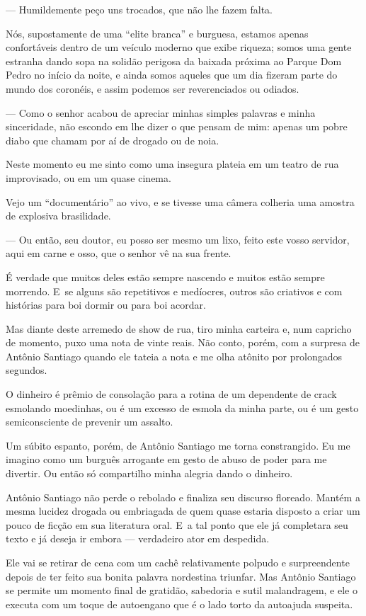 — Humildemente peço uns trocados, que não lhe fazem falta.

Nós, supostamente de uma ``elite branca'' e burguesa, estamos apenas
confortáveis dentro de um veículo moderno que exibe riqueza; somos uma
gente estranha dando sopa na solidão perigosa da baixada próxima ao
Parque Dom Pedro no início da noite, e ainda somos aqueles que um dia
fizeram parte do mundo dos coronéis, e assim podemos ser reverenciados
ou odiados.

— Como o senhor acabou de apreciar minhas simples palavras e minha
sinceridade, não escondo em lhe dizer o que pensam de mim: apenas um
pobre diabo que chamam por aí de drogado ou de noia.

Neste momento eu me sinto como uma insegura plateia em um teatro de rua
improvisado, ou em um quase cinema.

Vejo um ``documentário'' ao vivo, e se tivesse uma câmera colheria uma
amostra de explosiva brasilidade.

— Ou então, seu doutor, eu posso ser mesmo um lixo, feito este vosso
servidor, aqui em carne e osso, que o senhor vê na sua frente.

É verdade que muitos deles estão sempre nascendo e muitos estão sempre
morrendo. E~se alguns são repetitivos e medíocres, outros são criativos
e com histórias para boi dormir ou para boi acordar.

Mas diante deste arremedo de show de rua, tiro minha carteira e, num
capricho de momento, puxo uma nota de vinte reais. Não conto, porém, com
a surpresa de Antônio Santiago quando ele tateia a nota e me olha
atônito por prolongados segundos.

O dinheiro é prêmio de consolação para a rotina de um dependente de
crack esmolando moedinhas, ou é um excesso de esmola da minha parte, ou
é um gesto semiconsciente de prevenir um assalto.

Um súbito espanto, porém, de Antônio Santiago me torna constrangido. Eu
me imagino como um burguês arrogante em gesto de abuso de poder para me
divertir. Ou então só compartilho minha alegria dando o dinheiro.

Antônio Santiago não perde o rebolado e finaliza seu discurso floreado.
Mantém a mesma lucidez drogada ou embriagada de quem quase estaria
disposto a criar um pouco de ficção em sua literatura oral. E~a tal
ponto que ele já completara seu texto e já deseja ir embora ---
verdadeiro ator em despedida.

\asterisc{}

Ele vai se retirar de cena com um cachê relativamente polpudo e
surpreendente depois de ter feito sua bonita palavra nordestina
triunfar. Mas Antônio Santiago se permite um momento final de gratidão,
sabedoria e sutil malandragem, e ele o executa com um toque de
autoengano que é o lado torto da autoajuda suspeita.

